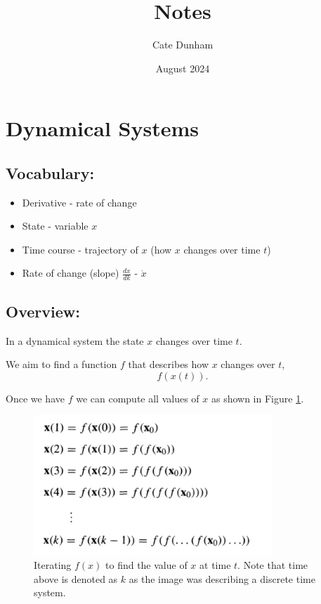 \documentclass{article}
\title{Notes}
\author{Cate Dunham}
\date{August 2024}
\begin{document}
\maketitle

\section{Dynamical Systems}


\subsection{Vocabulary:}
\begin{itemize}
    \item Derivative - rate of change
    \item State - variable $x$
    \item Time course - trajectory of $x$ (how $x$ changes over time $t$)
    \item Rate of change (slope) $\frac{dx}{dk}$ - $\dot{x}$
\end{itemize}

\subsection{Overview:}
In a dynamical system the state $x$ changes over time $t$.

We aim to find a function $f$ that describes how $x$ changes over $t$, 
\begin{equation}
    f(x(t)).
\end{equation}

Once we have $f$ we can compute all values of $x$ as shown in Figure \ref{fig:dynamical_systems_iteration}.
\begin{figure}[H]
    \centering
    \includegraphics[width=90mm]{images/dynamical_systems_iteration.png}
    \caption{Iterating $f(x)$ to find the value of $x$ at time $t$. Note that time above is denoted as $k$ as the image was describing a discrete time system.}
    \label{fig:dynamical_systems_iteration}
\end{figure}
\end{document}
